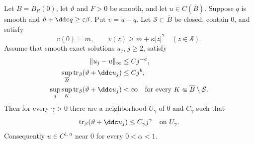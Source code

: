 \begin{proposition}\label{prop:interior-subpower}
Let $B=B_R(0)$, let $\vartheta$ and $F>0$ be smooth, and let $u\in C(\overline B)$. Suppose $q$ is smooth and $\vartheta+\ddc q\geq\varepsilon\beta$. Put $v=u-q$. Let $\mathcal S\subset\overline B$ be closed, contain $0$, and satisfy
\begin{equation}\label{eq:interior-quadratic-separation}
  v(0)=m,
  \qquad
  v(z)\geq m+\kappa|z|^2\quad(z\in\mathcal S).
\end{equation}
Assume that smooth exact solutions $u_j$, $j\geq2$, satisfy
\begin{align}
  \lVert u_j-u\rVert_\infty&\leq Cj^{-a}, \label{eq:interior-localization-a}\\
  \sup_{\overline B}\operatorname{tr}_\beta(\vartheta+\ddc u_j)&\leq Cj^b, \label{eq:interior-localization-b}\\
  \sup_j\sup_K\operatorname{tr}_\beta(\vartheta+\ddc u_j)&<\infty
  \quad\text{for every }K\Subset\overline B\setminus\mathcal S. \label{eq:interior-localization-c}
\end{align}
Then for every $\gamma>0$ there are a neighborhood $U_\gamma$ of $0$ and $C_\gamma$ such that
\begin{equation}\label{eq:interior-subpower-trace}
  \operatorname{tr}_\beta(\vartheta+\ddc u_j)\leq C_\gamma j^\gamma
  \quad\text{on }U_\gamma.
\end{equation}
Consequently $u\in C^{1,\alpha}$ near $0$ for every $0<\alpha<1$.
\end{proposition}

